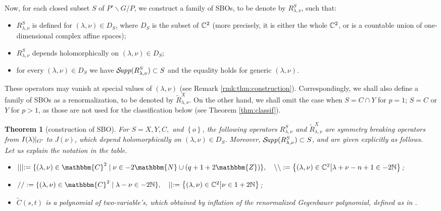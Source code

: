 \documentclass[12pt]{article} %
\newcommand{\assign}{:=}
\newtheorem{theorem}{Theorem}
\newcommand{\Supp}{\mathcal{S}\!{\it upp}}
\theoremstyle{definition}
\theoremstyle{exampstyle} \newtheorem{examp}[theorem]{Theorem}
\newcommand{\IlambdaGprime}{I(\lambda)\kern-0.3em\mid_{G'}}
\begin{document}
Now, for each closed subset $S$ of $P'\backslash G/P$, we construct a family of SBOs, to be denote by $R^S_{\lambda,\nu}$, such that:
\begin{itemize}
	\item $R_{\lambda,\nu}^S$ is defined for $(\lambda,\nu)\in D_S$, where $D_S$ is the subset of $\mathbb{C}^2$ (more precisely, it is either the whole $\mathbb{C}^2$, or is a countable
		union of one-dimensional complex affine spaces);
	\item $R_{\lambda,\nu}^S$ depends holomorphically on $(\lambda,\nu)\in D_S$;
	\item for every $(\lambda,\nu)\in D_S$ we have $\Supp(R_{\lambda,\nu}^S)\subset S$ and the equality holds for generic $(\lambda,\nu)$.
\end{itemize}
These operators may vanish at special values of $(\lambda,\nu)$ (see Remark \ref{rmk:thm:construction}). Correspondingly, we shall also define
a family of SBOs as a renormalization, to be denoted by $\tilde{R}^X_{\lambda,\nu}$. On the other hand, we shall omit the case when $S=C\cap Y$ for $p=1$;
$S=C$ or $Y$ for $p>1$, as those are not used for the classification below (see Theorem \ref{thm:classif}).
\newpage
\begin{theorem}[construction of SBO]\label{thm:construction}
	For $S=X,Y,C,$ and $\left\{ o \right\}$, the following operators $R_{\lambda,\nu}^S$ and $\tilde{R}_{\lambda,\nu}^X$ are symmetry breaking operators from $\IlambdaGprime$ to $J(\nu)$, which depend holomorphically on $(\lambda,\nu)\in D_S$. Moreover, $\Supp(R_{\lambda,\nu}^S)\subset S$, and are given explicitly as follows.\\
\vspace{\baselineskip}
Let us explain the notation in the table.
\begin{itemize}
	\item $\mid \mid \mid \assign \{ (\lambda, \nu) \in \mathbbm{C}^2 \mid \nu \in
	- 2\mathbbm{N} \cup (q + 1 + 2\mathbbm{Z}) \},\quad \backslash\backslash:=\mysetn{(\lambda,\nu)\in\C^2}{\lambda+\nu-n+1\in-2\N}$;
\item $/ / \assign
\{ (\lambda, \nu) \in \mathbbm{C}^2 \mid \lambda - \nu \in
-2\N \},\quad \mid\mid:=\mysetn{(\lambda,\nu)\in\C^2}{\nu\in1+2\N}$;
\item $\tilde{C}(s,t)$ is a polynomial of two-variable's, which obtained by inflation of the renormalized Gegenbauer polynomial, defined as in \cite[(16.3)]{kobayashi2015symmetry}.
\end{itemize}
\end{theorem}
\end{document}

